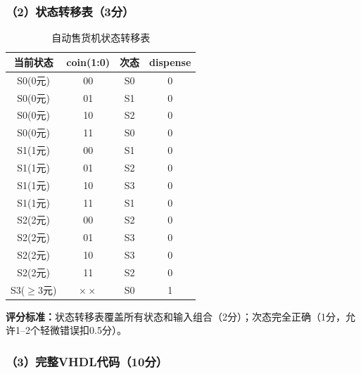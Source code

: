 \subsubsection*{（2）状态转移表（3分）}

\begin{table}[h]
\centering
\caption{自动售货机状态转移表}
\begin{tabular}{|c|c|c|c|}
\hline
\textbf{当前状态} & \textbf{coin(1:0)} & \textbf{次态} & \textbf{dispense} \\
\hline
S0(0元) & 00 & S0 & 0 \\
S0(0元) & 01 & S1 & 0 \\
S0(0元) & 10 & S2 & 0 \\
S0(0元) & 11 & S0 & 0 \\
\hline
S1(1元) & 00 & S1 & 0 \\
S1(1元) & 01 & S2 & 0 \\
S1(1元) & 10 & S3 & 0 \\
S1(1元) & 11 & S1 & 0 \\
\hline
S2(2元) & 00 & S2 & 0 \\
S2(2元) & 01 & S3 & 0 \\
S2(2元) & 10 & S3 & 0 \\
S2(2元) & 11 & S2 & 0 \\
\hline
S3($\ge$3元) & $\times\times$ & S0 & 1 \\
\hline
\end{tabular}
\end{table}

\textbf{评分标准：}状态转移表覆盖所有状态和输入组合（2分）；次态完全正确（1分，允许1--2个轻微错误扣0.5分）。

\subsubsection*{（3）完整VHDL代码（10分）}

